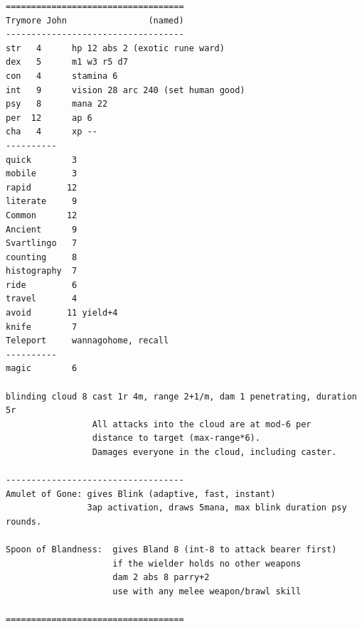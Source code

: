 \goodbreak \begin{samepage} \small \begin{verbatim}
===================================
Trymore John                (named)
-----------------------------------
str   4      hp 12 abs 2 (exotic rune ward)
dex   5      m1 w3 r5 d7
con   4      stamina 6
int   9      vision 28 arc 240 (set human good)
psy   8      mana 22
per  12      ap 6
cha   4      xp --
----------
quick        3
mobile       3
rapid       12
literate     9
Common      12
Ancient      9
Svartlingo   7
counting     8
histography  7
ride         6
travel       4
avoid       11 yield+4
knife        7
Teleport     wannagohome, recall
----------
magic        6

blinding cloud 8 cast 1r 4m, range 2+1/m, dam 1 penetrating, duration 5r
                 All attacks into the cloud are at mod-6 per
                 distance to target (max-range*6).
                 Damages everyone in the cloud, including caster.

-----------------------------------
Amulet of Gone: gives Blink (adaptive, fast, instant)
                3ap activation, draws 5mana, max blink duration psy rounds.

Spoon of Blandness:  gives Bland 8 (int-8 to attack bearer first)
                     if the wielder holds no other weapons
                     dam 2 abs 8 parry+2
                     use with any melee weapon/brawl skill

===================================
\end{verbatim} \normalsize \end{samepage}




\flushbottom


%
















